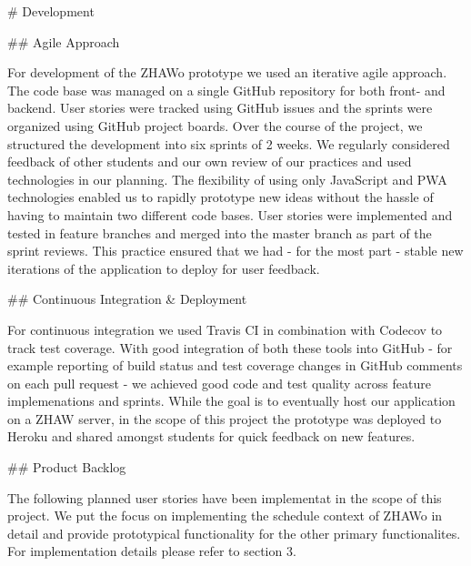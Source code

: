 \begin{markdown}

# Development

## Agile Approach

For development of the ZHAWo prototype we used an iterative agile approach. The code base was managed on a single GitHub repository \cite{DUMMY} for both front- and backend. User stories were tracked using GitHub issues and the sprints were organized using GitHub project boards. Over the course of the project, we structured the development into six sprints of 2 weeks. We regularly considered feedback of other students and our own review of our practices and used technologies in our planning. The flexibility of using only JavaScript and PWA technologies enabled us to rapidly prototype new ideas without the hassle of having to maintain two different code bases.
User stories were implemented and tested in feature branches and merged into the master branch as part of the sprint reviews. This practice ensured that we had - for the most part - stable new iterations of the application to deploy for user feedback.

## Continuous Integration \& Deployment

For continuous integration we used Travis CI \cite{DUMMY} in combination with Codecov \cite{DUMMY} to track test coverage. With good integration of both these tools into GitHub - for example reporting of build status and test coverage changes in GitHub comments on each pull request - we achieved good code and test quality across feature implemenations and sprints.
While the goal is to eventually host our application on a ZHAW server, in the scope of this project the prototype was deployed to Heroku \cite{DUMMY} and shared amongst students for quick feedback on new features.

\newpage

## Product Backlog

The following planned user stories have been implementat in the scope of this project. We put the focus on implementing the schedule context of ZHAWo in detail and provide prototypical functionality for the other primary functionalites. For implementation details please refer to section 3.


\end{markdown}
